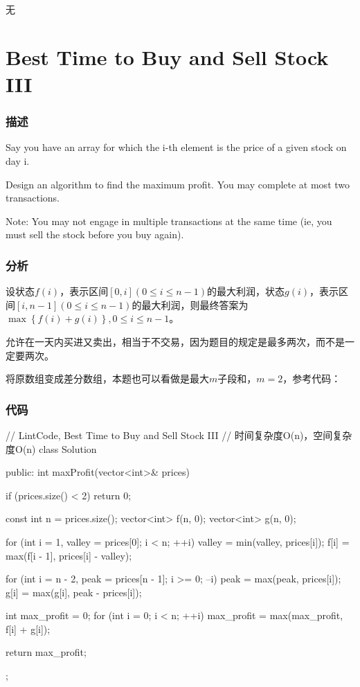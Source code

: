 \begindot
\item 无
\myenddot


\section{Best Time to Buy and Sell Stock III} %
\label{sec:best-time-to-buy-and-sell-stock-iii}


\subsubsection{描述}
Say you have an array for which the i-th element is the price of a given stock on day i.

Design an algorithm to find the maximum profit. You may complete at most two transactions.

Note: You may not engage in multiple transactions at the same time (ie, you must sell the stock before you buy again).


\subsubsection{分析}
设状态$f(i)$，表示区间$[0,i](0 \leq i \leq n-1)$的最大利润，状态$g(i)$，表示区间$[i, n-1](0 \leq i \leq n-1)$的最大利润，则最终答案为$\max\left\{f(i)+g(i)\right\},0 \leq i \leq n-1$。

允许在一天内买进又卖出，相当于不交易，因为题目的规定是最多两次，而不是一定要两次。

将原数组变成差分数组，本题也可以看做是最大$m$子段和，$m=2$，参考代码：

\subsubsection{代码}
\begin{Code}
// LintCode, Best Time to Buy and Sell Stock III
// 时间复杂度O(n)，空间复杂度O(n)
class Solution {
public:
    int maxProfit(vector<int>& prices) {
        if (prices.size() < 2) return 0;

        const int n = prices.size();
        vector<int> f(n, 0);
        vector<int> g(n, 0);

        for (int i = 1, valley = prices[0]; i < n; ++i) {
            valley = min(valley, prices[i]);
            f[i] = max(f[i - 1], prices[i] - valley);
        }

        for (int i = n - 2, peak = prices[n - 1]; i >= 0; --i) {
            peak = max(peak, prices[i]);
            g[i] = max(g[i], peak - prices[i]);
        }

        int max_profit = 0;
        for (int i = 0; i < n; ++i)
            max_profit = max(max_profit, f[i] + g[i]);

        return max_profit;
    }
};
\end{Code}


